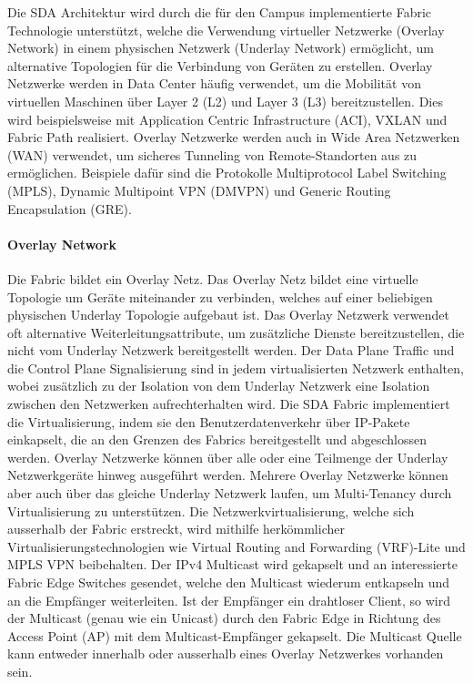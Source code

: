 Die SDA Architektur wird durch die für den Campus implementierte Fabric Technologie unterstützt, welche die Verwendung virtueller Netzwerke (Overlay Network) in einem physischen Netzwerk (Underlay Network) ermöglicht, um alternative Topologien für die Verbindung von Geräten zu erstellen. Overlay Netzwerke werden in Data Center häufig verwendet, um die Mobilität von virtuellen Maschinen über Layer 2 (L2) und Layer 3 (L3) bereitzustellen. Dies wird beispielsweise mit Application Centric Infrastructure (ACI), VXLAN und Fabric Path realisiert. Overlay Netzwerke werden auch in Wide Area Netzwerken (WAN) verwendet, um sicheres Tunneling von Remote-Standorten aus zu ermöglichen. Beispiele dafür sind die Protokolle Multiprotocol Label Switching (MPLS), Dynamic Multipoint VPN (DMVPN) und Generic Routing Encapsulation (GRE). \cite{sda-designguide}

\paragraph{Overlay Network}
Die Fabric bildet ein Overlay Netz. Das Overlay Netz bildet eine virtuelle Topologie um Geräte miteinander zu verbinden, welches auf einer beliebigen physischen Underlay Topologie aufgebaut ist. Das Overlay Netzwerk verwendet oft alternative Weiterleitungsattribute, um zusätzliche Dienste bereitzustellen, die nicht vom Underlay Netzwerk bereitgestellt werden. 
Der Data Plane Traffic und die Control Plane Signalisierung sind in jedem virtualisierten Netzwerk enthalten, wobei zusätzlich zu der Isolation von dem Underlay Netzwerk eine Isolation zwischen den Netzwerken aufrechterhalten wird. Die SDA Fabric implementiert die Virtualisierung, indem sie den Benutzerdatenverkehr über IP-Pakete einkapselt, die an den Grenzen des Fabrics bereitgestellt und abgeschlossen werden.
Overlay Netzwerke können über alle oder eine Teilmenge der Underlay Netzwerkgeräte hinweg ausgeführt werden. Mehrere Overlay Netzwerke können aber auch über das gleiche Underlay Netzwerk laufen, um Multi-Tenancy durch Virtualisierung zu unterstützen. Die Netzwerkvirtualisierung, welche sich ausserhalb der Fabric erstreckt, wird mithilfe herkömmlicher Virtualisierungstechnologien wie Virtual Routing and Forwarding (VRF)-Lite und MPLS VPN beibehalten.
Der IPv4 Multicast wird gekapselt und an interessierte Fabric Edge Switches gesendet, welche den Multicast wiederum entkapseln und an die Empfänger weiterleiten. Ist der Empfänger ein drahtloser Client, so wird der Multicast (genau wie ein Unicast) durch den Fabric Edge in Richtung des Access Point (AP) mit dem Multicast-Empfänger gekapselt. Die Multicast Quelle kann entweder innerhalb oder ausserhalb eines Overlay Netzwerkes vorhanden sein. \cite{sda-designguide}

